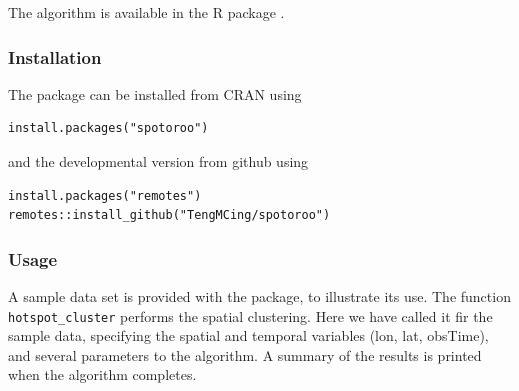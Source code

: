 The algorithm is available in the R package .

\hypertarget{installation}{%
\subsubsection{Installation}\label{installation}}

The package can be installed from CRAN using

\begin{verbatim}
install.packages("spotoroo")
\end{verbatim}

and the developmental version from github using

\begin{verbatim}
install.packages("remotes")
remotes::install_github("TengMCing/spotoroo")
\end{verbatim}

\hypertarget{usage}{%
\subsubsection{Usage}\label{usage}}

A sample data set is provided with the package, to illustrate its use.
The function \texttt{hotspot\_cluster} performs the spatial clustering.
Here we have called it fir the sample data, specifying the spatial and
temporal variables (lon, lat, obsTime), and several parameters to the
algorithm. A summary of the results is printed when the algorithm
completes.

